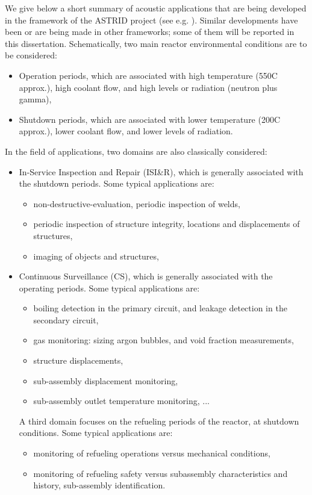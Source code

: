     We give below a short summary of acoustic applications that are being developed in the framework of the ASTRID project (see e.g. \parencite{Giot2017Nuclearinstrumentationmeasurement}).
Similar developments have been or are being made in other frameworks; some of them will be reported in this dissertation.
    Schematically, two main reactor environmental conditions are to be considered:
    \begin{itemize}
    \item Operation periods, which are associated with high temperature (550\textdegree{}C approx.), high coolant flow, and high levels or radiation (neutron plus gamma),
    \item Shutdown periods, which are associated with lower temperature (200\textdegree{}C approx.), lower coolant flow, and lower levels of radiation.
    \end{itemize}
    In the field of applications, two domains are also classically considered:
    \begin{itemize}
    \item In-Service Inspection and Repair (ISI\&R), which is generally associated with the shutdown periods. Some typical applications are:
        \begin{itemize}
        \item non-destructive-evaluation, periodic inspection of welds,
        \item periodic inspection of structure integrity, locations and displacements of structures,
        \item imaging of objects and structures,
        \end{itemize}
    \item Continuous Surveillance (CS), which is generally associated with the operating periods.
    Some typical applications are:
        \begin{itemize}
        \item boiling detection in the primary circuit, and leakage detection in the secondary circuit,
        \item gas monitoring: sizing argon bubbles, and void fraction measurements,
        \item structure displacements,
        \item sub-assembly displacement monitoring,
        \item sub-assembly outlet temperature monitoring, ...
        \end{itemize}
    A third domain focuses on the refueling periods of the reactor, at shutdown conditions.
    Some typical applications are:
       \begin{itemize}
       \item monitoring of refueling operations versus mechanical conditions,
       \item monitoring of refueling safety versus subassembly characteristics and history, sub-assembly identification.
       \end{itemize}
    \end{itemize}

